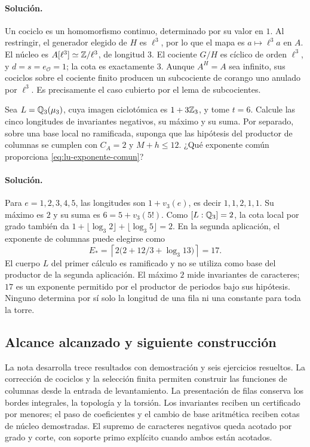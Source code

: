 \paragraph{Solución.}
Un cociclo es un homomorfismo continuo, determinado por su valor
en $1$. Al restringir, el generador elegido de $H$ es $\ell^3$,
por lo que el mapa es $a\mapsto\ell^3a$ en $A$. El núcleo es
$A[\ell^3]\simeq\mathbb{Z}/\ell^3$, de longitud $3$.
El cociente $G/H$ es cíclico de orden $\ell^3$, y
$d=s=e_{\mathcal O}=1$; la cota es exactamente $3$.
Aunque $A^H=A$ sea infinito, sus cociclos sobre el cociente finito
producen un subcociente de corango uno anulado por $\ell^3$.
Es precisamente el caso cubierto por el lema de subcocientes.

\begin{ejercicio}
\label{ex:lu-6}
Sea $L=\mathbb{Q}_3(\mu_3)$, cuya imagen ciclotómica es $1+3\mathbb{Z}_3$,
y tome $t=6$. Calcule las cinco longitudes de invariantes
negativos, su máximo y su suma. Por separado, sobre una base local
no ramificada, suponga que las hipótesis del productor de columnas
se cumplen con $C_A=2$ y $M+h\le12$. ¿Qué exponente común
proporciona \eqref{eq:lu-exponente-comun}?
\end{ejercicio}
\paragraph{Solución.}
Para $e=1,2,3,4,5$, las longitudes son
$1+v_3(e)$, es decir $1,1,2,1,1$. Su máximo es $2$ y su suma
es $6=5+v_3(5!)$. Como $[L:\mathbb{Q}_3]=2$, la cota local por grado
también da $1+\lfloor\log_3 2\rfloor+\lfloor\log_3 5\rfloor=2$.
En la segunda aplicación, el exponente de columnas puede elegirse como
\[
 E_*=\left\lceil2\bigl(2+12/3+\log_3 13\bigr)\right\rceil=17.
\]
El cuerpo $L$ del primer cálculo es ramificado y no se utiliza
como base del productor de la segunda aplicación.
El máximo $2$ mide
invariantes de caracteres; $17$ es un exponente permitido por
el productor de periodos bajo sus hipótesis. Ninguno determina
por sí solo la longitud de una fila ni una constante para toda
la torre.

\subsection{Alcance alcanzado y siguiente construcción}
\label{subsec:lu-frontera}

La nota desarrolla trece resultados con demostración y seis
ejercicios resueltos. La corrección de cociclos y la selección
finita permiten construir las funciones de columnas desde la
entrada de levantamiento. La presentación de filas conserva los
bordes integrales, la topología y la torsión. Los invariantes
reciben un certificado por menores; el paso de coeficientes y el
cambio de base aritmética reciben cotas de núcleo demostradas.
El supremo de caracteres negativos queda acotado por grado y
corte, con soporte primo explícito cuando ambos están acotados.

